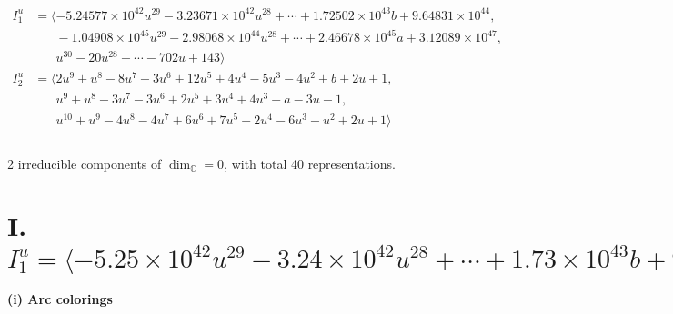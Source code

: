 \documentclass[1p]{elsarticle_modified}
\theoremstyle{definition}
\begin{document}
\begin{align*}
I^u_{1}&=\langle 
-5.24577\times10^{42} u^{29}-3.23671\times10^{42} u^{28}+\cdots+1.72502\times10^{43} b+9.64831\times10^{44},\\
\phantom{I^u_{1}}&\phantom{= \langle  }-1.04908\times10^{45} u^{29}-2.98068\times10^{44} u^{28}+\cdots+2.46678\times10^{45} a+3.12089\times10^{47},\\
\phantom{I^u_{1}}&\phantom{= \langle  }u^{30}-20 u^{28}+\cdots-702 u+143\rangle \\
I^u_{2}&=\langle 
2 u^9+u^8-8 u^7-3 u^6+12 u^5+4 u^4-5 u^3-4 u^2+b+2 u+1,\\
\phantom{I^u_{2}}&\phantom{= \langle  }u^9+u^8-3 u^7-3 u^6+2 u^5+3 u^4+4 u^3+a-3 u-1,\\
\phantom{I^u_{2}}&\phantom{= \langle  }u^{10}+u^9-4 u^8-4 u^7+6 u^6+7 u^5-2 u^4-6 u^3- u^2+2 u+1\rangle \\
\\
\end{align*}
\raggedright * 2 irreducible components of $\dim_{\mathbb{C}}=0$, with total 40 representations.\\
\newpage
\renewcommand{\arraystretch}{1}
\centering \section*{I. $I^u_{1}= \langle -5.25\times10^{42} u^{29}-3.24\times10^{42} u^{28}+\cdots+1.73\times10^{43} b+9.65\times10^{44},\;-1.05\times10^{45} u^{29}-2.98\times10^{44} u^{28}+\cdots+2.47\times10^{45} a+3.12\times10^{47},\;u^{30}-20 u^{28}+\cdots-702 u+143 \rangle$}
\flushleft \textbf{(i) Arc colorings}\\
\end{document}
